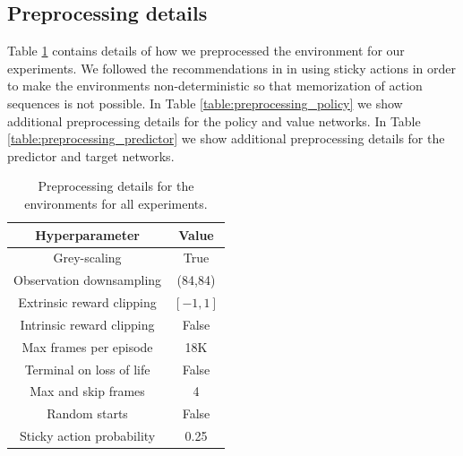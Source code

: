 \documentclass{article} %
\begin{document}
\subsection{Preprocessing details}
\label{sec:proprocessing}
Table \ref{table:preprocessing_env} contains details of how we preprocessed the environment for our experiments. We followed the recommendations in \cite{machado2017revisiting} in using sticky actions in order to make the environments non-deterministic so that memorization of action sequences is not possible. In Table \ref{table:preprocessing_policy} we show additional preprocessing details for the policy and value networks. In Table \ref{table:preprocessing_predictor} we show additional preprocessing details for the predictor and target networks.
\begin{table}[ht]
\centering
\begin{tabular}{c | c} 
 Hyperparameter & Value  \\ [0.5ex] 
 \hline
 Grey-scaling & True  \\ 
 Observation downsampling & (84,84)  \\
 Extrinsic reward clipping & $[-1,1]$  \\
 Intrinsic reward clipping & False  \\
 Max frames per episode & 18K \\
 Terminal on loss of life & False \\
 Max and skip frames & 4 \\
 Random starts & False \\
 Sticky action probability & 0.25 \\ [1ex] 
\end{tabular}
\caption{Preprocessing details for the environments for all experiments.}
\label{table:preprocessing_env}
\end{table}
\end{document}
